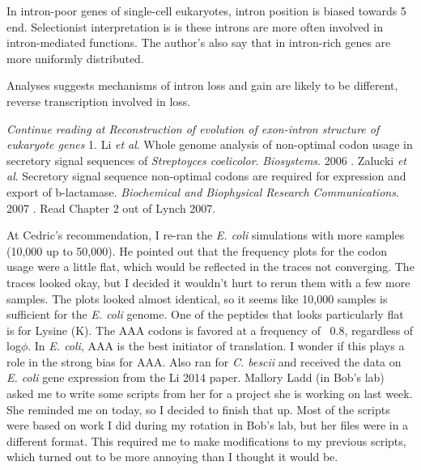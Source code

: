 \documentclass[11pt]{labbook}
\begin{document}
In intron-poor genes of single-cell eukaryotes, intron position is biased towards 5 end. Selectionist interpretation is is these introns are more often involved in intron-mediated functions. The author's also say that in intron-rich genes are more uniformly distributed. 

Analyses suggests mechanisms of intron loss and gain are likely to be different, reverse transcription involved in loss.

\textit{Continue reading at Reconstruction of evolution of exon-intron structure of eukaryote genes}
1. Li \textit{et al}.
Whole genome analysis of non-optimal codon usage in secretory signal sequences of \textit{Streptoyces coelicolor}. \textit{Biosystems}. 2006
. Zalucki \textit{et al}. Secretory signal sequence non-optimal codons are required for expression and export of b-lactamase. \textit{Biochemical and Biophysical Research Communications}. 2007
. Read Chapter 2 out of Lynch 2007.
\let\cleardoublepage\clearpage

At Cedric's recommendation, I re-ran the \textit{E. coli} simulations with more samples (10,000 up to 50,000). He pointed out that the frequency plots for the codon usage were a little flat, which would be reflected in the traces not converging. The traces looked okay, but I decided it wouldn't hurt to rerun them with a few more samples. The plots looked almost identical, so it seems like 10,000 samples is sufficient for the \textit{E. coli} genome. One of the peptides that looks particularly flat is for Lysine (K). The AAA codons is favored at a frequency of ~0.8, regardless of log$\phi$. In \textit{E. coli}, AAA is the best initiator of translation. I wonder if this plays a role in the strong bias for AAA.
\newline
Also ran for \textit{C. bescii} and received the data on \textit{E. coli} gene expression from the Li 2014 paper.
\newline
Mallory Ladd (in Bob's lab) asked me to write some scripts from her for a project she is working on last week. She reminded me on today, so I decided to finish that up. Most of the scripts were based on work I did during my rotation in Bob's lab, but her files were in a different format. This required me to make modifications to my previous scripts, which turned out to be more annoying than I thought it would be.
\end{document}
